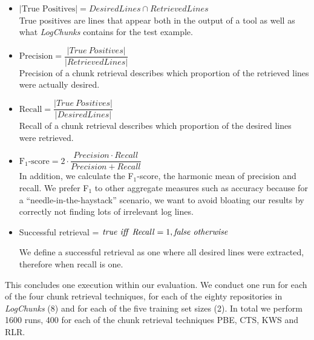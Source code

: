 \vspace{0.2cm}
\begin{itemize}[leftmargin=0.4cm] \itemsep1em
	\item $|\mbox{True\ Positives}| = \mathit{DesiredLines} \cap
	\mathit{RetrievedLines}$ \vspace{0.2cm}\\
	True positives are lines that appear both in the output of a
	tool as well as what \textit{LogChunks} contains for the
  test example.


	\item $\mbox{Precision} = \dfrac{|\mathit{True\
	Positives}|}{|\mathit{RetrievedLines}|}$ \vspace{0.21cm} \\
	Precision of a chunk retrieval describes which proportion of
	the retrieved lines were actually desired.

	\item $\mbox{Recall} =
	\dfrac{|\mathit{True\ Positives}|}{|\mathit{DesiredLines}|}$
	\vspace{0.2cm} \\
	Recall of a chunk retrieval describes which proportion of the
	desired lines were retrieved.

	\item $\mbox{F$_{1}$-score} = 2 \cdot \dfrac{\mathit{Precision}
	\cdot \mathit{Recall}}{\mathit{Precision} + \mathit{Recall}}$
	\vspace{0.2cm}\\
	In addition, we calculate the F$_{1}$-score, the harmonic mean
	of precision and recall.
  We prefer F$_{1}$ to other aggregate
	measures such as accuracy because for a
	``needle-in-the-haystack'' scenario, we want to avoid bloating
	our results by correctly not finding lots of irrelevant log
	lines.

	\item Successful retrieval = $\mathit{true}\ \mathit{iff}\
	\mathit{Recall} = 1, \mathit{false\ otherwise}\vspace{0.1cm}$

	We define a successful retrieval as one where all desired
	lines were
	extracted, therefore when recall is one.
\end{itemize}
This concludes one execution within our evaluation.
We conduct one run for each of the four chunk retrieval techniques,
for each of the eighty repositories in \emph{LogChunks} (8)
and for each of the five training set sizes (2).
In total we perform 1600 runs, 400 for each of the chunk retrieval
techniques PBE, CTS, KWS and RLR.

